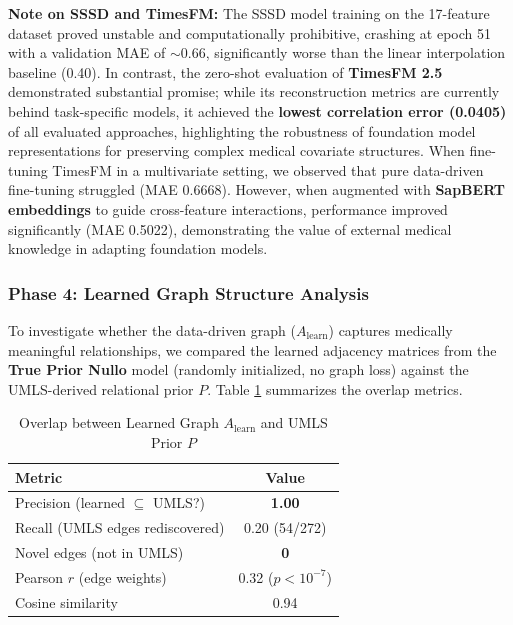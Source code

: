 \textbf{Note on SSSD and TimesFM:} The SSSD model training on the 17-feature dataset proved unstable and computationally prohibitive, crashing at epoch 51 with a validation MAE of $\sim$0.66, significantly worse than the linear interpolation baseline (0.40). In contrast, the zero-shot evaluation of \textbf{TimesFM 2.5} demonstrated substantial promise; while its reconstruction metrics are currently behind task-specific models, it achieved the \textbf{lowest correlation error (0.0405)} of all evaluated approaches, highlighting the robustness of foundation model representations for preserving complex medical covariate structures. When fine-tuning TimesFM in a multivariate setting, we observed that pure data-driven fine-tuning struggled (MAE 0.6668). However, when augmented with \textbf{SapBERT embeddings} to guide cross-feature interactions, performance improved significantly (MAE 0.5022), demonstrating the value of external medical knowledge in adapting foundation models.

\subsubsection{Phase 4: Learned Graph Structure Analysis}
To investigate whether the data-driven graph ($A_{\text{learn}}$) captures medically meaningful relationships, we compared the learned adjacency matrices from the \textbf{True Prior Nullo} model (randomly initialized, no graph loss) against the UMLS-derived relational prior $P$. Table \ref{tab:graph_overlap} summarizes the overlap metrics.

\begin{table}[h]
\centering
\caption{Overlap between Learned Graph $A_{\text{learn}}$ and UMLS Prior $P$}
\label{tab:graph_overlap}
\begin{tabular}{@{}lc@{}}
\toprule
\textbf{Metric} & \textbf{Value} \\ \midrule
Precision (learned $\subseteq$ UMLS?)   & \textbf{1.00} \\
Recall (UMLS edges rediscovered)         & 0.20 (54/272) \\
Novel edges (not in UMLS)                & \textbf{0} \\
Pearson $r$ (edge weights)               & 0.32 ($p < 10^{-7}$) \\
Cosine similarity                        & 0.94 \\ \bottomrule
\end{tabular}
\end{table}

